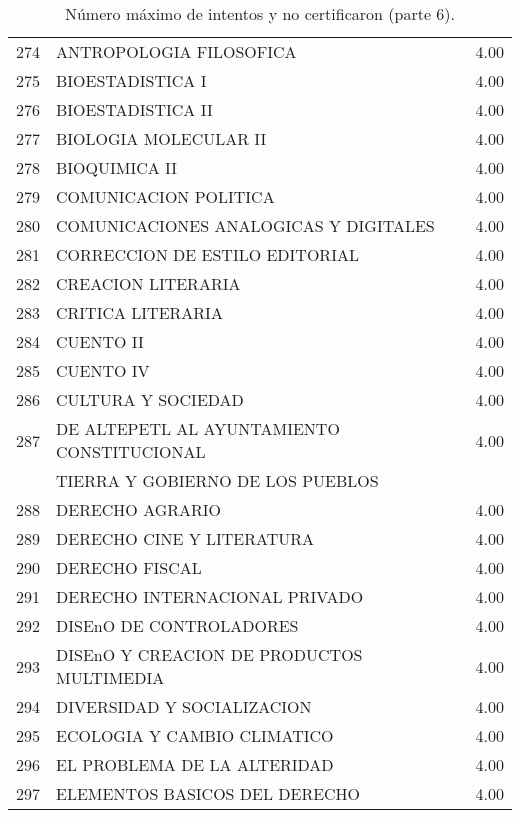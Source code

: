 \documentclass[12pt]{article}
\begin{document}
\begin{table}[ht]
{\begin{tabular}{rlr}
  274 & ANTROPOLOGIA FILOSOFICA & 4.00 \\ 
  275 & BIOESTADISTICA I & 4.00 \\ 
  276 & BIOESTADISTICA II & 4.00 \\ 
  277 & BIOLOGIA MOLECULAR II & 4.00 \\ 
  278 & BIOQUIMICA II & 4.00 \\ 
  279 & COMUNICACION POLITICA & 4.00 \\ 
  280 & COMUNICACIONES ANALOGICAS Y DIGITALES & 4.00 \\ 
  281 & CORRECCION DE ESTILO EDITORIAL & 4.00 \\ 
  282 & CREACION LITERARIA & 4.00 \\ 
  283 & CRITICA LITERARIA & 4.00 \\ 
  284 & CUENTO II & 4.00 \\ 
  285 & CUENTO IV & 4.00 \\ 
  286 & CULTURA Y SOCIEDAD & 4.00 \\ 
  287 & DE ALTEPETL AL AYUNTAMIENTO CONSTITUCIONAL & 4.00 \\ 
   &  TIERRA Y GOBIERNO DE LOS PUEBLOS &  \\ 
  288 & DERECHO AGRARIO & 4.00 \\ 
  289 & DERECHO CINE Y LITERATURA & 4.00 \\ 
  290 & DERECHO FISCAL & 4.00 \\ 
  291 & DERECHO INTERNACIONAL PRIVADO & 4.00 \\ 
  292 & DISEnO DE CONTROLADORES & 4.00 \\ 
  293 & DISEnO Y CREACION DE PRODUCTOS MULTIMEDIA & 4.00 \\ 
  294 & DIVERSIDAD Y SOCIALIZACION & 4.00 \\ 
  295 & ECOLOGIA Y CAMBIO CLIMATICO & 4.00 \\ 
  296 & EL PROBLEMA DE LA ALTERIDAD & 4.00 \\ 
  297 & ELEMENTOS BASICOS DEL DERECHO & 4.00 \\ 
   \hline
\end{tabular}
}\caption{\label{Num_Max_Intentos_Nunca_Cert_6} N\'umero m\'aximo de intentos y no certificaron (parte 6).}

\end{table}
\end{document}
